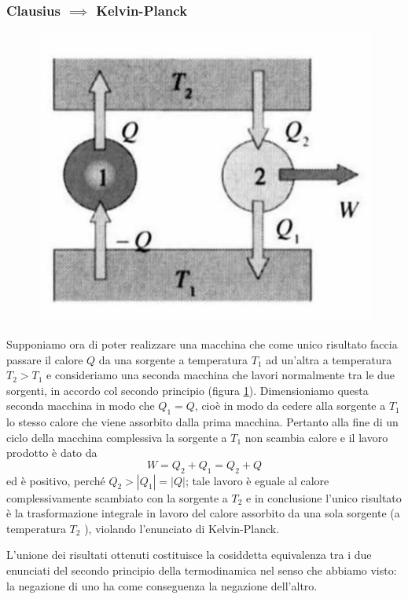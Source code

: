 \documentclass[class=book, crop=false, oneside, 12pt]{standalone}
\begin{document}
\subsubsection*{Clausius \(\implies\) Kelvin-Planck}

\begin{figure}[h]
    \includegraphics[scale=0.4]{not_clausius.png}
    \centering
    \caption{}
    \label{not_clausius}
\end{figure}

Supponiamo ora di poter realizzare una macchina che come unico risultato faccia passare il calore \(Q\) da una sorgente a temperatura \(T_1\) ad un'altra a temperatura \(T_2 > T_1\) e consideriamo una seconda macchina che lavori normalmente tra le due sorgenti, in accordo col secondo principio (figura \ref{not_clausius}). 
Dimensioniamo questa seconda macchina in modo che \( Q_1 = Q\), cioè in modo da cedere alla sorgente a \(T_1\) lo stesso calore che viene assorbito dalla prima macchina.
Pertanto alla fine di un ciclo della macchina complessiva la sorgente a \(T_1\) non scambia calore e il lavoro prodotto è dato da 
\begin{equation*}
    W = Q_2 + Q_1 = Q_2 + Q
\end{equation*}
ed è positivo, perché \(Q_2 > |Q_1| = |Q| \); tale lavoro è eguale al calore complessivamente scambiato con la sorgente a \(T_2\) e in conclusione l'unico risultato è la trasformazione integrale in lavoro del calore assorbito da una sola sorgente (a temperatura \(T_2\) ), violando l'enunciato di Kelvin-Planck.

L'unione dei risultati ottenuti costituisce la cosiddetta equivalenza tra i due enunciati del secondo principio della termodinamica nel senso che abbiamo visto: la negazione di uno ha come conseguenza la negazione dell'altro.
\end{document}
